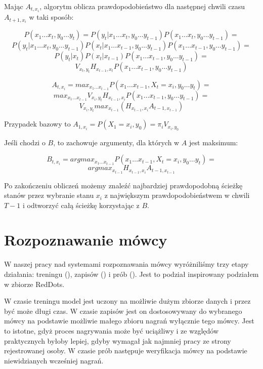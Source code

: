 Mając $A_{t,x_i}$, algorytm oblicza prawdopodobieństwo dla następnej chwili czasu $A_{t+1,x_i}$ w taki sposób:

$$P(x_1 \dots x_t, y_0 \dots y_t) = P(y_t | x_1 \dots x_t, y_0 \dots y_{t-1}) P(x_1 \dots x_t, y_0 \dots y_{t-1}) =$$
$$P(y_t | x_1 \dots x_t, y_0 \dots y_{t-1}) P(x_t | x_1 \dots x_{t-1}, y_0 \dots y_{t-1}) P(x_1 \dots x_{t-1}, y_0 \dots y_{t-1}) =$$
$$P(y_t | x_t) P(x_t | x_{t-1}) P(x_1 \dots x_{t-1}, y_0 \dots y_{t-1}) =$$
$$V_{x_t, y_t} H_{x_{t-1}, x_t} P(x_1 \dots x_{t-1}, y_0 \dots y_{t-1})$$

$$A_{t,x_i} = max_{x_1 \dots x_{t-1}} P(x_1 \dots x_{t-1}, X_t = x_i, y_0 \dots y_t) =$$
$$max_{x_1 \dots x_{t-1}} V_{x_i, y_t} H_{x_{t-1}, x_i} P(x_1 \dots x_{t-1}, y_0 \dots y_{t-1}) =$$
$$V_{x_i, y_t} max_{x_{t-1}}(H_{x_{t-1}, x_i} A_{t-1, x_{t-1}})$$

Przypadek bazowy to $A_{1,x_i} = P(X_1 = x_i, y_0) = \pi_i V_{x_i, y_0}$

Jeśli chodzi o $B$, to zachowuje argumenty, dla których w $A$ jest maksimum:

$$B_{t, x_i} = argmax_{x_1 \dots x_{t-1}} P(x_1 \dots x_{t-1}, X_t = x_i, y_0 \dots y_t) =$$
$$argmax_{x_{t-1}} H_{x_{t-1}, x_i} A_{t-1, x_{t-1}}$$

Po zakończeniu obliczeń możemy znaleźć najbardziej prawdopodobną ścieżkę stanów przez wybranie stanu $x_i$ z największym prawdopodobieństwem w chwili $T-1$ i odtworzyć całą ścieżkę korzystając z $B$.


\section{Rozpoznawanie mówcy}\label{sec:rozpoznawanie_mowcy}

W naszej pracy nad systemami rozpoznawania mówcy wyróżniliśmy trzy etapy działania: treningu (), 
zapisów () i prób (). Jest to podział inspirowany podziałem w zbiorze RedDots.

W czasie treningu model jest uczony na możliwie dużym zbiorze danych i przez być może długi czas. W czasie zapisów
jest on dostosowywany do wybranego mówcy na podstawie możliwie małego zbioru nagrań wyłącznie tego mówcy. Jest
to istotne, gdyż proces nagrywania może być uciążliwy i ze względów praktycznych byłoby lepiej, gdyby wymagał
jak najmniej pracy ze strony rejestrowanej osoby. W czasie prób następuje weryfikacja mówcy na podstawie niewidzianych
wcześniej nagrań.

